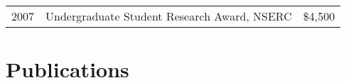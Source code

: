 \documentclass[12pt]{article}
\begin{document}
\begin{tabular}{llr}
  2007 & Undergraduate Student Research Award, NSERC & \$4,500\\
\end{tabular}

\newpage
\section*{Publications}
\end{document}
